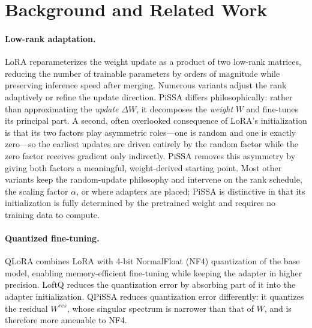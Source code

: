 \documentclass[mlmain]{jmlr}
\begin{document}
\section{Background and Related Work}
\label{sec:related}
\paragraph{Low-rank adaptation.} LoRA \citep{hu2022lora} reparameterizes the weight update as a product of two low-rank matrices, reducing the number of trainable parameters by orders of magnitude while preserving inference speed after merging. Numerous variants adjust the rank adaptively or refine the update direction. PiSSA differs philosophically: rather than approximating the \emph{update} $\Delta W$, it decomposes the \emph{weight} $W$ and fine-tunes its principal part. A second, often overlooked consequence of LoRA's initialization is that its two factors play asymmetric roles---one is random and one is exactly zero---so the earliest updates are driven entirely by the random factor while the zero factor receives gradient only indirectly. PiSSA removes this asymmetry by giving both factors a meaningful, weight-derived starting point. Most other variants keep the random-update philosophy and intervene on the rank schedule, the scaling factor $\alpha$, or where adapters are placed; PiSSA is distinctive in that its initialization is fully determined by the pretrained weight and requires no training data to compute.

\paragraph{Quantized fine-tuning.} QLoRA \citep{dettmers2023qlora} combines LoRA with 4-bit NormalFloat (NF4) quantization of the base model, enabling memory-efficient fine-tuning while keeping the adapter in higher precision. LoftQ \citep{li2023loftq} reduces the quantization error by absorbing part of it into the adapter initialization. QPiSSA reduces quantization error differently: it quantizes the residual $W^{res}$, whose singular spectrum is narrower than that of $W$, and is therefore more amenable to NF4.
\end{document}
